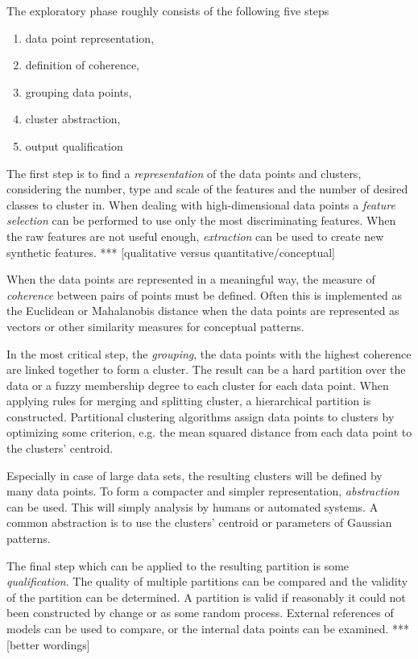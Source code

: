 The exploratory phase roughly consists of the following five steps
\cite{jain1999data}
\begin{enumerate}
	\item data point representation,
	\item definition of coherence,
	\item grouping data points,
	\item cluster abstraction,
	\item output qualification
\end{enumerate}

The first step is to find a \emph{representation} of the data points and
clusters, considering the number, type and scale of the features and the
number of desired classes to cluster in. When dealing with high-dimensional
data points a \emph{feature selection} can be performed to use only the most
discriminating features. When the raw features are not useful enough,
\emph{extraction} can be used to create new synthetic features. ***
[qualitative versus quantitative/conceptual]

When the data points are represented in a meaningful way, the measure of
\emph{coherence} between pairs of points must be defined. Often this is
implemented as the Euclidean
or Mahalanobis distance when the data points are represented as vectors or
other similarity measures for conceptual patterns.

In the most critical step, the \emph{grouping}, the data points with the
highest coherence are linked together to form a cluster. The result can be a
hard partition over the data or a fuzzy membership degree to each cluster for
each data point. When applying rules for merging and splitting cluster, a
hierarchical partition is constructed. Partitional clustering algorithms
assign data points to clusters by optimizing some criterion, e.g. the mean
squared distance from each data point to the clusters' centroid.

Especially in case of large data sets, the resulting clusters will be defined
by many data points. To form a compacter and simpler representation,
\emph{abstraction} can be used. This will simply analysis by humans or
automated systems. A common abstraction is to use the clusters' centroid
\cite{diday1976clustering} or parameters of Gaussian patterns.

The final step which can be applied to the resulting partition is some
\emph{qualification}. The quality of multiple partitions can be compared and
the validity of the partition can be determined. A partition is valid if
reasonably it could not been constructed by change or as some random process.
External references of models can be used to compare, or the internal data
points can be examined. *** [better wordings]


